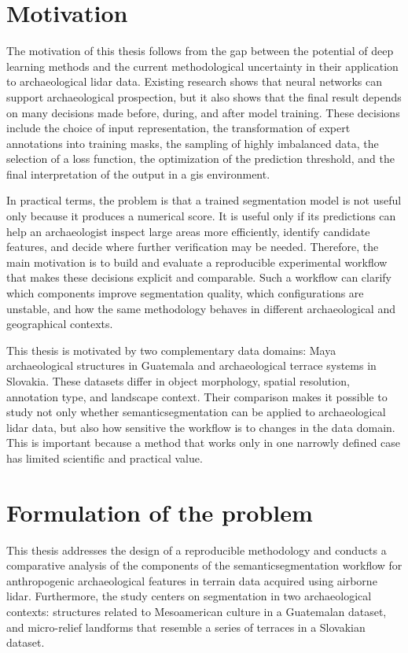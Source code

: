 \section{Motivation}

The motivation of this thesis follows from the gap between the potential of deep learning methods and the current methodological uncertainty in their application to archaeological \gls{lidar} data. Existing research shows that neural networks can support archaeological prospection, but it also shows that the final result depends on many decisions made before, during, and after model training. These decisions include the choice of input representation, the transformation of expert annotations into training masks, the sampling of highly imbalanced data, the selection of a loss function, the optimization of the prediction threshold, and the final interpretation of the output in a \gls{gis} environment.

In practical terms, the problem is that a trained segmentation model is not useful only because it produces a numerical score. It is useful only if its predictions can help an archaeologist inspect large areas more efficiently, identify candidate features, and decide where further verification may be needed. Therefore, the main motivation is to build and evaluate a reproducible experimental workflow that makes these decisions explicit and comparable. Such a workflow can clarify which components improve segmentation quality, which configurations are unstable, and how the same methodology behaves in different archaeological and geographical contexts.

This thesis is motivated by two complementary data domains: Maya archaeological structures in Guatemala and archaeological terrace systems in Slovakia. These datasets differ in object morphology, spatial resolution, annotation type, and landscape context. Their comparison makes it possible to study not only whether \gls{semanticsegmentation} can be applied to archaeological \gls{lidar} data, but also how sensitive the workflow is to changes in the data domain. This is important because a method that works only in one narrowly defined case has limited scientific and practical value.

\section{Formulation of the problem}

This thesis addresses the design of a reproducible methodology and conducts a comparative analysis of the components of the \gls{semanticsegmentation} workflow for anthropogenic archaeological features in terrain data acquired using airborne \gls{lidar}. Furthermore, the study centers on segmentation in two archaeological contexts: structures related to Mesoamerican culture in a Guatemalan dataset, and micro-relief landforms that resemble a series of terraces in a Slovakian dataset.

